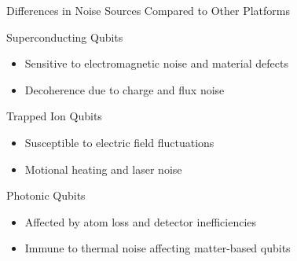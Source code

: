 \documentclass{beamer}
\begin{document}
\begin{frame}{Differences in Noise Sources Compared to Other Platforms}
    \begin{block}{Superconducting Qubits}
        \begin{itemize}
            \item Sensitive to electromagnetic noise and material defects
            \item Decoherence due to charge and flux noise
        \end{itemize}
    \end{block}
    \begin{block}{Trapped Ion Qubits}
        \begin{itemize}
            \item Susceptible to electric field fluctuations
            \item Motional heating and laser noise
        \end{itemize}
    \end{block}
    \begin{block}{Photonic Qubits}
        \begin{itemize}
            \item Affected by atom loss and detector inefficiencies
            \item Immune to thermal noise affecting matter-based qubits
        \end{itemize}
    \end{block}
\end{frame}
\end{document}
